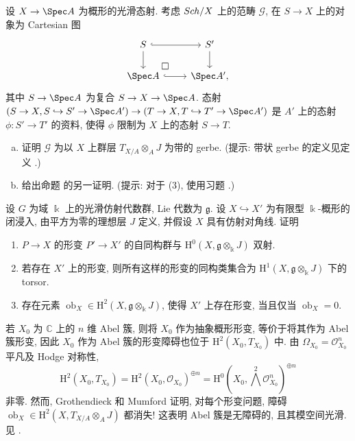 \begin{exercise}\label{src:C.2.5}
设 $X\to\Spec A$ 为概形的光滑态射. 考虑 $Sch/X$ 上的范畴 $\mathcal G$, 在 $S\to X$ 上的对象为 Cartesian 图
\[
\begin{tikzcd}
S\arrow[r,hook]\arrow[d]&S'\arrow[d]\\
\Spec A\arrow[r,hook]\arrow[ur,phantom,"\square",very near start]&\Spec A',
\end{tikzcd}
\]
其中 $S\to\Spec A$ 为复合 $S\to X\to\Spec A$. 态射 $(S\to X,S\hookrightarrow S'\to\Spec A')\to(T\to X,T\hookrightarrow T'\to\Spec A')$ 是 $A'$ 上的态射 $\phi:S'\to T'$ 的资料, 使得 $\phi$ 限制为 $X$ 上的态射 $S\to T$.
\begin{enumerate}[(a)]
\item 证明 $\mathcal G$ 为以 $X$ 上群层 $T_{X/A}\otimes_AJ$ 为带的 gerbe. (提示: 带状 gerbe 的定义见定义 .)
\item 给出命题  的另一证明. (提示: 对于 (3), 使用习题 .)
\end{enumerate}
\end{exercise}
\begin{exercise}\label{src:C.2.6}
设 $G$ 为域 $\Bbbk$ 上的光滑仿射代数群, Lie 代数为 $\mathfrak g$. 设 $X\hookrightarrow X'$ 为有限型 $\Bbbk$-概形的闭浸入, 由平方为零的理想层 $J$ 定义, 并假设 $X$ 具有仿射对角线. 证明
\begin{enumerate}[(1)]
\item $P\to X$ 的形变 $P'\to X'$ 的自同构群与 $\mathrm H^0(X,\mathfrak g\otimes_{\Bbbk}J)$ 双射.
\item 若存在 $X'$ 上的形变, 则所有这样的形变的同构类集合为 $\mathrm H^1(X,\mathfrak g\otimes_{\Bbbk}J)$ 下的 torsor.
\item 存在元素 $\operatorname{ob}_X\in\mathrm H^2(X,\mathfrak g\otimes_{\Bbbk}J)$, 使得 $X'$ 上存在形变, 当且仅当 $\operatorname{ob}_X=0$.
\end{enumerate}
\end{exercise}
\begin{example}[Abel 簇]\label{src:C.2.7}
若 $X_0$ 为 $\mathbb C$ 上的 $n$ 维 Abel 簇, 则将 $X_0$ 作为抽象概形形变, 等价于将其作为 Abel 簇形变, 因此 $X_0$ 作为 Abel 簇的形变障碍也位于 $\mathrm H^2(X_0,T_{X_0})$ 中. 由 $\Omega_{X_0}=\mathcal O_{X_0}^n$ 平凡及 Hodge 对称性,
\[
\mathrm H^2(X_0,T_{X_0})=\mathrm H^2(X_0,\mathcal O_{X_0})^{\oplus n}=\mathrm H^0(X_0,\bigwedge^2\mathcal O_{X_0}^n)^{\oplus n}
\]
非零. 然而, Grothendieck 和 Mumford 证明, 对每个形变问题, 障碍 $\operatorname{ob}_X\in\mathrm H^2(X,T_{X/A}\otimes_AJ)$ 都消失! 这表明 Abel 簇是无障碍的, 且其模空间光滑. 见 \cite{Oor71}.
\end{example}
